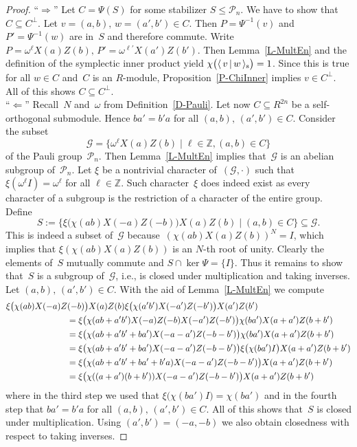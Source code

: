 \documentclass[11pt]{article}
\theoremstyle{definition}
\numberwithin{equation}{section}
\newcommand{\Z}{{\mathbb Z}}
\newcommand{\cG}{{\mathcal G}}
\newcommand{\cP}{{\mathcal P}}
\newcommand{\inners}[2]{\mbox{$\langle{\,{#1}\,}|\,{#2}\,\rangle_{\rm s}$}}
\newcounter{ara}
\newcounter{rom}
\begin{document}
\begin{proof}
``$\Rightarrow$'' Let $C=\Psi(S)$ for some stabilizer $S\leq\cP_n$. We have to show that $C\subseteq C^\perp$.
Let $v=(a,b),\,w=(a',b')\in C$. Then $P=\Psi^{-1}(v)$ and $P'=\Psi^{-1}(w)$ are in~$S$ and therefore commute.
Write $P=\omega^\ell X(a)Z(b),\,P'=\omega^{\ell'}X(a')Z(b')$.
Then Lemma~\ref{L-MultEn} and the definition of the symplectic inner product yield $\chi\big(\inners{v}{w}\big)=1$.
Since this is true for all $w\in C$ and~$C$ is an $R$-module, Proposition~\ref{P-ChiInner} implies $v\in C^\perp$.
All of this shows $C\subseteq C^\perp$.
\\
``$\Leftarrow$''
Recall~$N$ and~$\omega$ from Definition~\ref{D-Pauli}.
Let now $C\subseteq R^{2n}$ be a self-orthogonal submodule.
Hence $ba'=b'a$ for all $(a,b),\,(a',b')\in C$.
Consider the subset
\[
     \cG=\{\omega^\ell X(a)Z(b)\mid \ell\in\Z,(a,b)\in C\}
\]
of the Pauli group~$\cP_n$.
Then Lemma~\ref{L-MultEn} implies that~$\cG$ is an abelian subgroup of~$\cP_n$.
Let $\xi$ be a nontrivial character of~$(\cG,\cdot)$ such that $\xi(\omega^\ell I)=\omega^\ell$ for all $\ell\in\Z$.
Such character~$\xi$ does indeed exist as every character of a subgroup is the restriction of a character of the entire group.
Define
\[
    S:=\{\xi\big(\chi(ab)X(-a)Z(-b)\big)X(a)Z(b)\mid (a,b)\in C\}\subseteq\cG.
\]
This is indeed a subset of~$\cG$ because~$(\chi(ab)X(a)Z(b))^N=I$, which implies that $\xi(\chi(ab)X(a)Z(b))$ is an $N$-th root of unity.
Clearly the elements of~$S$ mutually commute and $S\cap \ker\Psi=\{I\}$.
Thus it remains to show that~$S$ is a subgroup of~$\cG$, i.e., is closed under multiplication and taking inverses.
Let $(a,b),\,(a',b')\in C$. With the aid of Lemma~\ref{L-MultEn}  we compute
\begin{align*}
   &\xi\big(\chi(ab)X(-a)Z(-b)\big)X(a)Z(b)\xi\big(\chi(a'b')X(-a')Z(-b')\big)X(a')Z(b')\\
   &\hspace*{7em}=\xi\big(\chi(ab+a'b')X(-a)Z(-b)X(-a')Z(-b')\big)\chi(ba')X(a+a')Z(b+b')\\
   &\hspace*{7em}=\xi\big(\chi(ab+a'b'+ba')X(-a-a')Z(-b-b')\big)\chi(ba')X(a+a')Z(b+b')\\
   &\hspace*{7em}=\xi\big(\chi(ab+a'b'+ba')X(-a-a')Z(-b-b')\big)\xi\big(\chi(ba')I\big)X(a+a')Z(b+b')\\
   &\hspace*{7em}=\xi\big(\chi(ab+a'b'+ba'+b'a)X(-a-a')Z(-b-b')\big)X(a+a')Z(b+b')\\
   &\hspace*{7em}=\xi\big(\chi((a+a')(b+b'))X(-a-a')Z(-b-b')\big)X(a+a')Z(b+b')
\end{align*}
where in the third step we used that $\xi\big(\chi(ba')I\big)=\chi(ba')$ and in the fourth step
that  $ba'=b'a$ for all $(a,b),\,(a',b')\in C$.
All of this shows that~$S$ is closed under multiplication.
Using $(a',b')=(-a,-b)$ we also obtain closedness with respect to taking inverses.
\end{proof}
\end{document}

